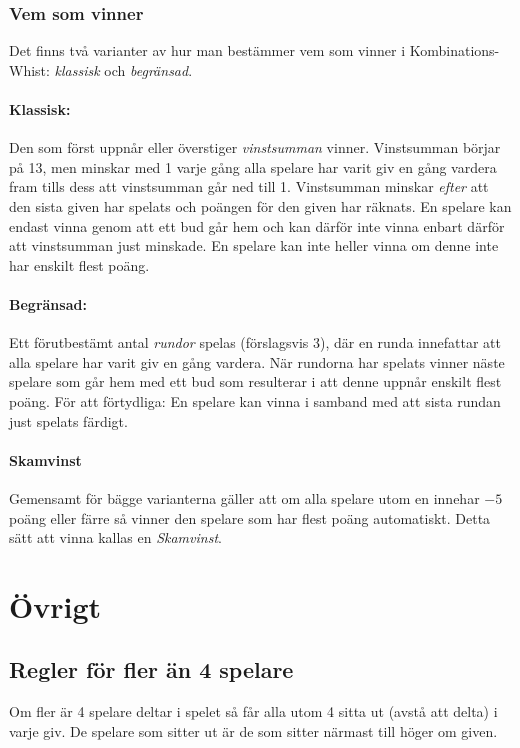 \documentclass[a4paper]{article}
\begin{document}
			\subsubsection{Vem som vinner}
				\label{sec:winning}
				Det finns två varianter av hur man bestämmer vem som vinner i Kombinations-Whist: \emph{klassisk} och \emph{begränsad}.

				\paragraph{Klassisk:}
					Den som först uppnår eller överstiger \emph{vinstsumman} vinner. Vinstsumman börjar på 13, men minskar med 1 varje gång alla spelare har varit giv en gång vardera fram tills dess att vinstsumman går ned till 1. Vinstsumman minskar \emph{efter} att den sista given har spelats och poängen för den given har räknats. En spelare kan endast vinna genom att ett bud går hem och kan därför inte vinna enbart därför att vinstsumman just minskade. En spelare kan inte heller vinna om denne inte har enskilt flest poäng.

				\paragraph{Begränsad:}
					Ett förutbestämt antal \emph{rundor} spelas (förslagsvis 3), där en runda innefattar att alla spelare har varit giv en gång vardera. När rundorna har spelats vinner näste spelare som går hem med ett bud som resulterar i att denne uppnår enskilt flest poäng. För att förtydliga: En spelare kan vinna i samband med att sista rundan just spelats färdigt.

				\paragraph{Skamvinst} Gemensamt för bägge varianterna gäller att om alla spelare utom en innehar $-5$ poäng eller färre så vinner den spelare som har flest poäng automatiskt. Detta sätt att vinna kallas en \emph{Skamvinst}.

	\section{Övrigt}
		\subsection{Regler för fler än 4 spelare}
			Om fler är 4 spelare deltar i spelet så får alla utom 4 sitta ut (avstå att delta) i varje giv. De spelare som sitter ut är de som sitter närmast till höger om given.
		
\end{document}
